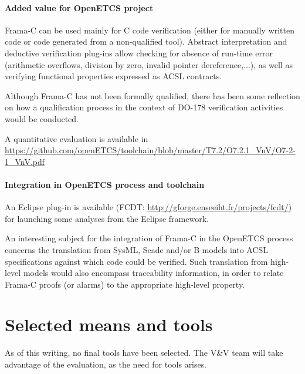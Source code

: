 \paragraph{Added value for OpenETCS project}

Frama-C can be used mainly for C code verification (either for manually written
code or code generated from a non-qualified tool). Abstract interpretation
and deductive verification plug-ins allow checking for absence of run-time
error (arithmetic overflows, division by zero, invalid pointer
dereference,...), as well as verifying functional properties expressed as
ACSL contracts.

Although Frama-C has not been formally qualified, there has been some reflection
on how a qualification process in the context of DO-178 verification activities
would be conducted.

A quantitative evaluation is available in \url{https://github.com/openETCS/toolchain/blob/master/T7.2/O7.2.1_VnV/O7-2-1_VnV.pdf}

\paragraph{Integration in OpenETCS process and toolchain}

An Eclipse plug-in is available 
(FCDT: \url{http://gforge.enseeiht.fr/projects/fcdt/}) for launching some
analyses from the Eclipse framework.

An interesting subject for the integration of Frama-C in the OpenETCS process
concerns the translation from SysML, Scade and/or B models into ACSL
specifications against which code could be verified. Such translation from
high-level models would also encompass traceability information, in order to
relate Frama-C proofs (or alarms) to the appropriate high-level property.

\section{Selected means and tools}

As of this writing, no final tools have been selected.  The V\&V team will take advantage of the evaluation, as the need for tools arises.